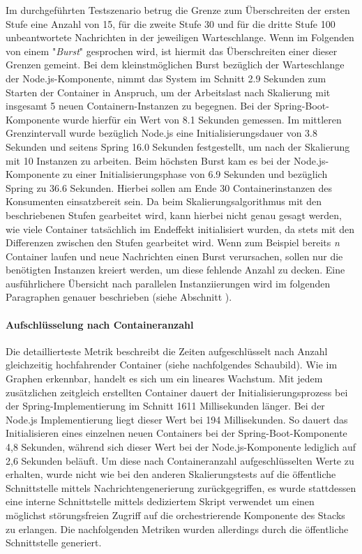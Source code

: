 Im durchgeführten Testszenario betrug die Grenze zum Überschreiten der ersten Stufe eine Anzahl von 15, für die zweite Stufe 30 und für die dritte Stufe 100 unbeantwortete Nachrichten in der jeweiligen Warteschlange. Wenn im Folgenden von einem "\emph{Burst}" gesprochen wird, ist hiermit das Überschreiten einer dieser Grenzen gemeint. Bei dem kleinstmöglichen Burst bezüglich der Warteschlange der Node.js-Komponente, nimmt das System im Schnitt 2.9 Sekunden zum Starten der Container in Anspruch, um der Arbeitslast nach Skalierung mit insgesamt 5 neuen Containern-Instanzen zu begegnen. Bei der Spring-Boot-Komponente wurde hierfür ein Wert von 8.1 Sekunden gemessen. Im mittleren Grenzintervall wurde bezüglich Node.js eine Initialisierungsdauer von 3.8 Sekunden und seitens Spring 16.0 Sekunden festgestellt, um nach der Skalierung mit 10 Instanzen zu arbeiten. Beim höchsten Burst kam es bei der Node.js-Komponente zu einer Initialisierungsphase von 6.9 Sekunden und bezüglich Spring zu 36.6 Sekunden. Hierbei sollen am Ende 30 Containerinstanzen des Konsumenten einsatzbereit sein. Da beim Skalierungsalgorithmus mit den beschriebenen Stufen gearbeitet wird, kann hierbei nicht genau gesagt werden, wie viele Container tatsächlich im Endeffekt initialisiert wurden, da stets mit den Differenzen zwischen den Stufen gearbeitet wird. Wenn zum Beispiel bereits \emph{n} Container laufen und neue Nachrichten einen Burst verursachen, sollen nur die benötigten Instanzen kreiert werden, um diese fehlende Anzahl zu decken. Eine ausführlichere Übersicht nach parallelen Instanziierungen wird im folgenden Paragraphen genauer beschrieben (siehe Abschnitt ).


\paragraph{Aufschlüsselung nach Containeranzahl}
\label{par:specContainer}
Die detaillierteste Metrik beschreibt die Zeiten aufgeschlüsselt nach Anzahl gleichzeitig hochfahrender Container (siehe nachfolgendes Schaubild). Wie im Graphen erkennbar, handelt es sich um ein lineares Wachstum. Mit jedem zusätzlichen zeitgleich erstellten Container dauert der Initialisierungsprozess bei der Spring-Implementierung im Schnitt 1611 Millisekunden länger. Bei der Node.js Implementierung liegt dieser Wert bei 194 Millisekunden. So dauert das Initialisieren eines einzelnen neuen Containers bei der Spring-Boot-Komponente 4,8 Sekunden, während sich dieser Wert bei der Node.js-Komponente lediglich auf 2,6 Sekunden beläuft. Um diese nach Containeranzahl aufgeschlüsselten Werte zu erhalten, wurde nicht wie bei den anderen Skalierungstests auf die öffentliche Schnittstelle mittels Nachrichtengenerierung zurückgegriffen, es wurde stattdessen eine interne Schnittstelle mittels dediziertem Skript verwendet um einen möglichst störungsfreien Zugriff auf die orchestrierende Komponente des Stacks zu erlangen. Die nachfolgenden Metriken wurden allerdings durch die öffentliche Schnittstelle generiert.

